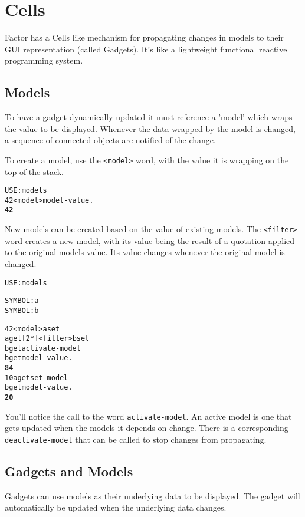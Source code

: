 \chapter{Cells}\label{cells}

Factor has a Cells like mechanism for propagating changes in models to
their GUI representation (called Gadgets). It's like a lightweight
functional reactive programming system. 

\section{Models}
To have a gadget dynamically updated it must reference a 'model' which
wraps the value to be displayed. Whenever the data wrapped by the
model is changed, a sequence of connected objects are notified of the
change.  

To create a model, use the \verb|<model>| word, with the value it is wrapping
on the top of the stack.

\begin{alltt}
USE: models
42 <model> model-value .
  \textbf{42}
\end{alltt}

New models can be created based on the value of existing models. The \verb|<filter>| word creates a new model, with its value being the result of a quotation applied to the original models value. Its value changes whenever the original model is changed.
\begin{alltt}
USE: models

SYMBOL: a
SYMBOL: b

42 <model> a set
a get [ 2 * ] <filter> b set
b get activate-model
b get model-value .
  \textbf{84}
10 a get set-model
b get model-value .
  \textbf{20}
\end{alltt}
You'll notice the call to the word \verb|activate-model|. An active model is one that gets updated when the models it depends on change. There is a corresponding \verb|deactivate-model| that can be called to stop changes from propagating.



\section{Gadgets and Models}
Gadgets can use models as their underlying data to be displayed. The gadget will automatically be updated when the underlying data changes. 

